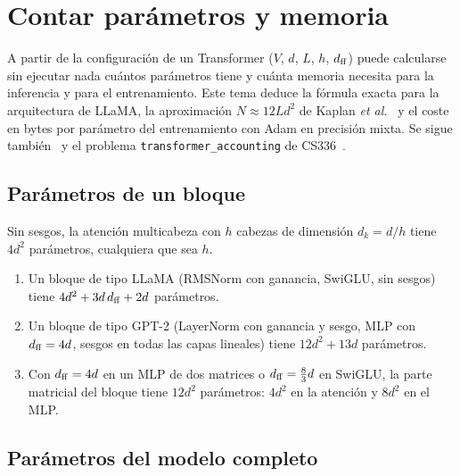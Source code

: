 \chapter{Contar parámetros y memoria}
\label{tema:5}

A partir de la configuración de un Transformer ($V$, $d$, $L$, $h$, $d_{\mathrm{ff}}$) puede calcularse sin ejecutar nada cuántos parámetros tiene y cuánta memoria necesita para la inferencia y para el entrenamiento. Este tema deduce la fórmula exacta para la arquitectura de LLaMA, la aproximación $N\approx 12Ld^{2}$ de Kaplan \emph{et al.}~\cite[§2.1]{kaplan} y el coste en bytes por parámetro del entrenamiento con Adam en precisión mixta. Se sigue también~\cite[§7.1.1 y ejercicio~7.1]{jm3} y el problema \texttt{transformer\_accounting} de CS336~\cite{cs336}.

\section{Parámetros de un bloque}

\begin{proposicion}\label{prop:cabezas}
Sin sesgos, la atención multicabeza con $h$ cabezas de dimensión $d_k=d/h$ tiene $4d^{2}$ parámetros, cualquiera que sea $h$.
\end{proposicion}

\begin{proposicion}\label{prop:bloque}
\begin{enumerate}
  \item Un bloque de tipo LLaMA (RMSNorm con ganancia, SwiGLU, sin sesgos) tiene $4d^{2}+3d\,d_{\mathrm{ff}}+2d$ parámetros.
  \item Un bloque de tipo GPT-2 (LayerNorm con ganancia y sesgo, MLP con $d_{\mathrm{ff}}=4d$, sesgos en todas las capas lineales) tiene $12d^{2}+13d$ parámetros.
  \item Con $d_{\mathrm{ff}}=4d$ en un MLP de dos matrices o $d_{\mathrm{ff}}=\frac83 d$ en SwiGLU, la parte matricial del bloque tiene $12d^{2}$ parámetros: $4d^{2}$ en la atención y $8d^{2}$ en el MLP.
\end{enumerate}
\end{proposicion}

\section{Parámetros del modelo completo}


